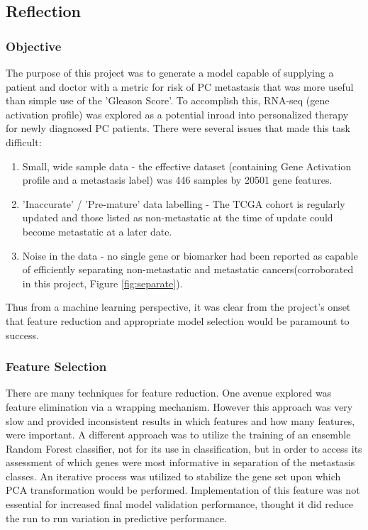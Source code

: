 \documentclass[final]{article}
\begin{document}
\subsection{Reflection}

\subsubsection{Objective}

The purpose of this project was to generate a model capable of supplying a
patient and doctor with a metric for risk of PC metastasis that was
more useful than simple use of the 'Gleason Score'.  To accomplish this, RNA-seq
(gene activation profile) was explored as a potential inroad into personalized
therapy for newly diagnosed PC patients.  There were several issues
that made this task difficult:

\begin{enumerate}
\item Small, wide sample data - the effective
dataset (containing Gene Activation profile and a metastasis label) was 446
samples by 20501 gene features.
\item 'Inaccurate' / 'Pre-mature' data labelling -
The TCGA cohort is regularly updated and those listed as non-metastatic at the
time of update could become metastatic at a later date.
\item Noise in the data -
no single gene or biomarker had been reported as capable of efficiently
separating non-metastatic and metastatic cancers(corroborated in this project,
Figure \ref{fig:separate}).
\end{enumerate}

Thus from a machine learning perspective, it was clear from the project's onset
that feature reduction and appropriate model selection would be paramount to
success.

\subsubsection{Feature Selection}

There are many techniques for feature reduction.  One avenue explored was
feature elimination via a wrapping mechanism.  However this approach was very
slow and provided inconsistent results in which features and how many features,
were important. A different approach was to utilize the
training of an ensemble Random Forest classifier, not for its use in
classification, but in order to access its assessment of which genes were most
informative in separation of the metastasis classes.  An iterative process was
utilized to stabilize the gene set upon which PCA transformation would be performed. Implementation of this feature was not essential for increased final model
validation performance, thought it did reduce the run to run variation in predictive
performance.
\end{document}
